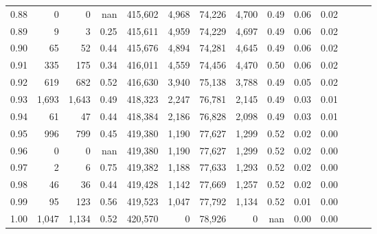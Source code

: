 \begin{tabular}{rrrrrrrrrrrrrr}
0.88 &       0 &      0 &   nan &  415,602 &    4,968 &  74,226 &   4,700 &  0.49 &  0.06 &      0.02 \\
0.89 &       9 &      3 &  0.25 &  415,611 &    4,959 &  74,229 &   4,697 &  0.49 &  0.06 &      0.02 \\
0.90 &      65 &     52 &  0.44 &  415,676 &    4,894 &  74,281 &   4,645 &  0.49 &  0.06 &      0.02 \\
0.91 &     335 &    175 &  0.34 &  416,011 &    4,559 &  74,456 &   4,470 &  0.50 &  0.06 &      0.02 \\
0.92 &     619 &    682 &  0.52 &  416,630 &    3,940 &  75,138 &   3,788 &  0.49 &  0.05 &      0.02 \\
0.93 &   1,693 &  1,643 &  0.49 &  418,323 &    2,247 &  76,781 &   2,145 &  0.49 &  0.03 &      0.01 \\
0.94 &      61 &     47 &  0.44 &  418,384 &    2,186 &  76,828 &   2,098 &  0.49 &  0.03 &      0.01 \\
0.95 &     996 &    799 &  0.45 &  419,380 &    1,190 &  77,627 &   1,299 &  0.52 &  0.02 &      0.00 \\
0.96 &       0 &      0 &   nan &  419,380 &    1,190 &  77,627 &   1,299 &  0.52 &  0.02 &      0.00 \\
0.97 &       2 &      6 &  0.75 &  419,382 &    1,188 &  77,633 &   1,293 &  0.52 &  0.02 &      0.00 \\
0.98 &      46 &     36 &  0.44 &  419,428 &    1,142 &  77,669 &   1,257 &  0.52 &  0.02 &      0.00 \\
0.99 &      95 &    123 &  0.56 &  419,523 &    1,047 &  77,792 &   1,134 &  0.52 &  0.01 &      0.00 \\
1.00 &   1,047 &  1,134 &  0.52 &  420,570 &        0 &  78,926 &       0 &   nan &  0.00 &      0.00 \\
\bottomrule
\end{tabular}
